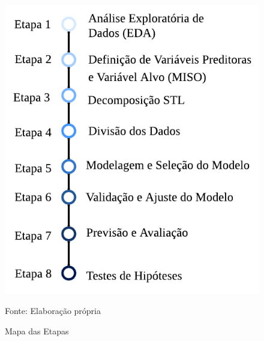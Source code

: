 \begin{figure}[H]
	\centering
	\caption{Mapa das Etapas}
	\label{fig:etapas}
	\includegraphics[width=1\linewidth]{Introducao/Figuras/Etapas}
	
	Fonte: Elaboração própria
\end{figure}




    